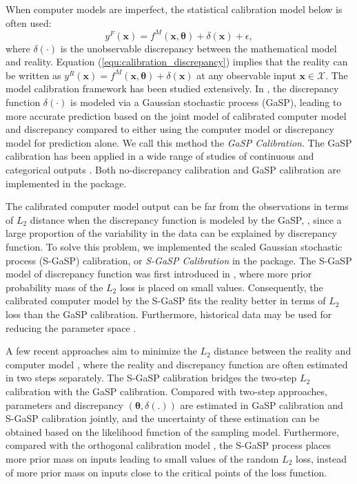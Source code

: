 When  computer models are imperfect, the statistical calibration model below is often used: 
\begin{equation}
y^F(\mathbf x)= f^M(\mathbf x, \bm \theta)+ \delta(\mathbf x)+\epsilon,
\label{equ:calibration_discrepancy}
\end{equation}
where $\delta(\cdot)$ is the unobservable discrepancy between the mathematical model and reality. Equation (\ref{equ:calibration_discrepancy}) implies that the reality can be written as $y^R(\mathbf x)= f^M(\mathbf x, \bm \theta)+ \delta(\mathbf x)$ at any observable input $\mathbf x \in \mathcal X$.  The model calibration framework has been studied extensively. In \cite{kennedy2001bayesian},  the discrepancy function $\delta(\cdot)$ is modeled via a Gaussian stochastic process (GaSP), leading to more accurate  prediction based on the joint model of calibrated computer model and discrepancy compared to either using the computer model  or discrepancy model for prediction alone.  We call this method the \textit{GaSP Calibration}. The GaSP calibration has been applied in a wide range of studies  of continuous and categorical outputs \citep{bayarri2007computer,higdon2008computer,paulo2012calibration,chang2016calibrating,chang2022ice}. Both no-discrepancy calibration and GaSP calibration are implemented in the  package.


The calibrated computer model output can be far from the observations in terms of $L_2$ distance when the discrepancy function is modeled by the GaSP,  \citep{arendt2012quantification}, since a large proportion of the variability in the data can be explained by discrepancy function. 
To solve this problem, we implemented the scaled Gaussian stochastic process (S-GaSP) calibration, or  \textit{S-GaSP Calibration} in the  package. The S-GaSP model of discrepancy function  was first introduced in \cite{gu2018sgasp}, where more prior probability mass of the $L_2$ loss is placed on small values. Consequently, the calibrated computer model by the S-GaSP  fits the reality better in terms of $L_2$ loss than the GaSP calibration. 
Furthermore, historical data may be  used for reducing the parameter space \citep{williamson2013history}. 

 A few recent approaches aim to minimize the  $L_2$ distance between the reality and computer model \citep{tuo2015efficient,wong2017frequentist}, where the reality and discrepancy function are often estimated in two steps separately. The S-GaSP calibration bridges the two-step $L_2$ calibration with the GaSP calibration. Compared with  two-step approaches, parameters  and discrepancy $(\bm \theta, \delta(.))$ are estimated in {GaSP calibration} and {S-GaSP calibration} jointly, and the uncertainty of these estimation can be obtained based on the likelihood function of the sampling model. Furthermore, compared with the orthogonal calibration model \citep{plumlee2017bayesian}, the S-GaSP process places more prior mass on inputs leading to small values of the random $L_2$ loss, instead of more prior mass on inputs close to the critical points of the loss function. 
 
